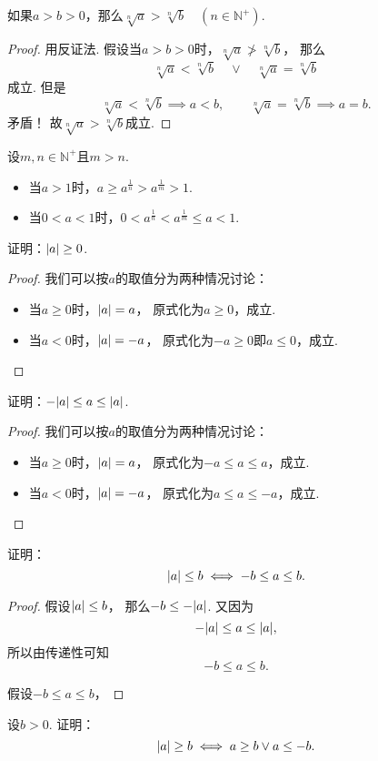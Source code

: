 \begin{theorem}
如果\(a>b>0\)，那么\(\sqrt[n]{a} > \sqrt[n]{b} \quad (n\in\mathbb{N}^+)\).
\begin{proof}
用反证法.
假设当\(a>b>0\)时，\(\sqrt[n]{a} \ngtr \sqrt[n]{b}\)，
那么\[
	\sqrt[n]{a} < \sqrt[n]{b}
	\quad\lor\quad
	\sqrt[n]{a} = \sqrt[n]{b}
\]成立.
但是\[
	\sqrt[n]{a} < \sqrt[n]{b} \implies a<b,
	\qquad
	\sqrt[n]{a} = \sqrt[n]{b} \implies a=b.
\]矛盾！
故\(\sqrt[n]{a}>\sqrt[n]{b}\)成立.
\end{proof}
\end{theorem}

\begin{theorem}
设\(m,n\in\mathbb{N}^+\)且\(m>n\).
\begin{itemize}
	\item 当\(a>1\)时，\(a \geq a^{\frac1n} > a^{\frac1m} > 1\).
	\item 当\(0<a<1\)时，\(0 < a^{\frac1n} < a^{\frac1m} \leq a < 1\).
\end{itemize}
\end{theorem}

\begin{example}
证明：\(\abs{a} \geq 0\).
\begin{proof}
我们可以按\(a\)的取值分为两种情况讨论：
\begin{itemize}
	\item 当\(a \geq 0\)时，\(\abs{a}=a\)，
	原式化为\(a \geq 0\)，成立.
	\item 当\(a < 0\)时，\(\abs{a}=-a\)，
	原式化为\(-a \geq 0\)即\(a \leq 0\)，成立.
	\qedhere
\end{itemize}
\end{proof}
\end{example}
\begin{example}
证明：\(-\abs{a} \leq a \leq \abs{a}\).
\begin{proof}
我们可以按\(a\)的取值分为两种情况讨论：
\begin{itemize}
	\item 当\(a \geq 0\)时，\(\abs{a}=a\)，
	原式化为\(-a \leq a \leq a\)，成立.
	\item 当\(a < 0\)时，\(\abs{a}=-a\)，
	原式化为\(a \leq a \leq -a\)，成立.
	\qedhere
\end{itemize}
\end{proof}
\end{example}
\begin{example}
证明：\[
	\abs{a} \leq b
	\iff
	-b \leq a \leq b.
\]
\begin{proof}
假设\(\abs{a} \leq b\)，
那么\(-b \leq -\abs{a}\).
又因为\[
	-\abs{a} \leq a \leq \abs{a},
\]
所以由传递性可知\[
	-b \leq a \leq b.
\]

假设\(-b \leq a \leq b\)，
\end{proof}
\end{example}
\begin{example}
设\(b>0\).
证明：\[
	\abs{a} \geq b
	\iff
	a \geq b \lor a \leq -b.
\]
\end{example}
